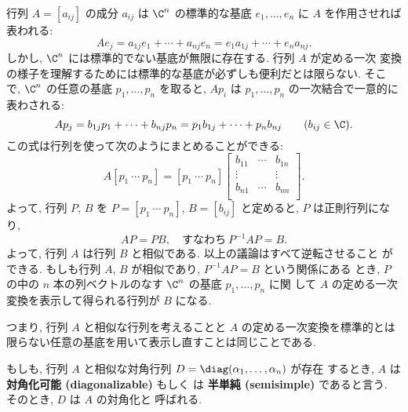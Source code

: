 \documentclass[12pt,twoside]{jarticle}
\begin{document}
行列 $A=[a_{ij}]$ の成分 $a_{ij}$ は $\C^n$ の標準的な基底 $e_1,\dots,e_n$ 
に $A$ を作用させれば表われる:
\begin{equation*}
  A e_j
  = a_{1j} e_1 + \cdots + a_{nj} e_n 
  = e_1 a_{1j} + \cdots + e_n a_{nj}.
\end{equation*}
しかし, $\C^n$ には標準的でない基底が無限に存在する.  行列 $A$ が定める一次
変換の様子を理解するためには標準的な基底が必ずしも便利だとは限らない.  そこ
で, $\C^n$ の任意の基底 $p_1,\dots,p_n$ を取ると, 
$A p_i$ は $p_1,\dots,p_n$ の一次結合で一意的に表わされる:
\begin{equation*}
    A p_j
  = b_{1j} p_1 + \cdots + b_{nj} p_n
  = p_1 b_{1j} + \cdots + p_n b_{nj}
  \qquad (b_{ij}\in\C).
\end{equation*}
この式は行列を使って次のようにまとめることができる:
\begin{equation*}
  A [p_1\ \cdots\ p_n]
  =
  [p_1\ \cdots\ p_n]
  \begin{bmatrix}
    b_{11} & \cdots & b_{1n} \\
    \vdots &        & \vdots \\
    b_{n1} & \cdots & b_{nn} \\
  \end{bmatrix}.
\end{equation*}
よって, 行列 $P$, $B$ を $P=[p_1\ \cdots\ p_n]$, $B = [b_{ij}]$ と定めると,
$P$ は正則行列になり,
\begin{equation*}
  AP = PB, \quad \text{すなわち}\  P^{-1}AP=B.
\end{equation*}
よって, 行列 $A$ は行列 $B$ と相似である.  以上の議論はすべて逆転させること
ができる.  もしも行列 $A$, $B$ が相似であり,  $P^{-1}AP=B$ という関係にある
とき, $P$ の中の $n$ 本の列ベクトルのなす $\C^n$ の基底 $p_1,\dots,p_n$ に関
して $A$ の定める一次変換を表示して得られる行列が $B$ になる.

つまり, 行列 $A$ と相似な行列を考えることと $A$ の定める一次変換を標準的とは
限らない任意の基底を用いて表示し直すことは同じことである.

もしも, 行列 $A$ と相似な対角行列 $D=\diag(\alpha_1,\dots,\alpha_n)$ が存在
するとき, $A$ は{\bf 対角化可能 (diagonalizable)} もしく
は {\bf 半単純 (semisimple)} であると言う.  そのとき, $D$ は $A$ の対角化と
呼ばれる. 
\end{document}

